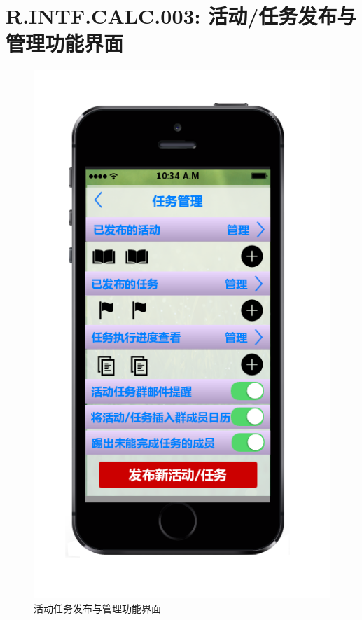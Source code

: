     \section{R.INTF.CALC.003: 活动/任务发布与管理功能界面}
    \begin{figure}[h]
        \centering
        \includegraphics[scale=0.6]{OutlineDesign/figures/活动任务发布与管理功能界面.png}
        \caption{活动任务发布与管理功能界面}
        \label{fig:server_flow}
    \end{figure}
    \newpage
